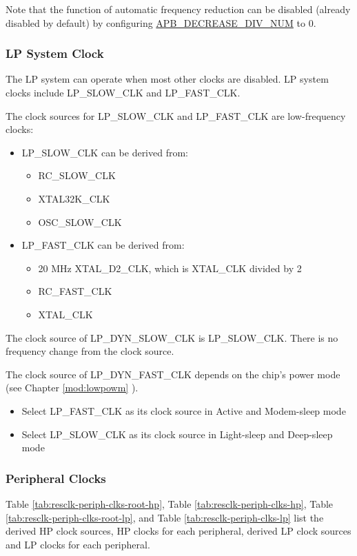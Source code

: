 \documentclass[main\_\_EN.tex]{subfiles}
\begin{document}
Note that the function of automatic frequency reduction can be disabled (already disabled by default) by configuring \hyperref[fielddesc:PCRAPBDECREASEDIVNUM]{APB\_DECREASE\_DIV\_NUM} to 0.




\subsubsection{LP System Clock}

The LP system can operate when most other clocks are disabled. LP system clocks include LP\_SLOW\_CLK and LP\_FAST\_CLK.

The clock sources for LP\_SLOW\_CLK and LP\_FAST\_CLK are low-frequency clocks:
\begin{itemize}
    \item LP\_SLOW\_CLK can be derived from:
    \begin{itemize}
        \item RC\_SLOW\_CLK
        \item XTAL32K\_CLK
        \item OSC\_SLOW\_CLK
    \end{itemize}
    \item LP\_FAST\_CLK can be derived from:
    \begin{itemize}
        \item 20 MHz XTAL\_D2\_CLK, which is XTAL\_CLK divided by 2
        \item RC\_FAST\_CLK
        \item XTAL\_CLK
    \end{itemize}
\end{itemize}


The clock source of LP\_DYN\_SLOW\_CLK is LP\_SLOW\_CLK. There is no frequency change from the clock source.

The clock source of LP\_DYN\_FAST\_CLK depends on the chip's power mode (see Chapter \ref{mod:lowpowm} \textit{}).

\begin{itemize}
    \item Select LP\_FAST\_CLK as its clock source in Active and Modem-sleep mode
    \item Select LP\_SLOW\_CLK as its clock source in Light-sleep and Deep-sleep mode
\end{itemize}

\subsubsection{Peripheral Clocks}
Table \ref{tab:resclk-periph-clks-root-hp}, Table \ref{tab:resclk-periph-clks-hp}, Table \ref{tab:resclk-periph-clks-root-lp}, and Table \ref{tab:resclk-periph-clks-lp} list the derived HP clock sources, HP clocks for each peripheral, derived LP clock sources and LP clocks for each peripheral.
\end{document}
